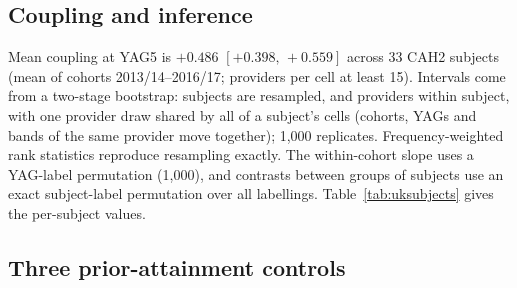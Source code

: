 \documentclass[11pt]{article}
\newcommand{\ci}[2]{$[#1,\allowbreak\,#2]$}
\begin{document}
\subsection{Coupling and inference}\label{sec:ukcoupling}

Mean coupling at YAG5 is $+0.486$ \ci{+0.398}{+0.559} across 33 CAH2 subjects (mean of cohorts 2013/14--2016/17;
providers per cell at least 15). Intervals come from a two-stage bootstrap: subjects are resampled, and providers
within subject, with one provider draw shared by all of a subject's cells (cohorts, YAGs and bands of the same
provider move together); 1,000 replicates. Frequency-weighted rank statistics reproduce resampling exactly. The
within-cohort slope uses a YAG-label permutation (1,000), and contrasts between groups of subjects use an exact
subject-label permutation over all labellings. Table~\ref{tab:uksubjects} gives the per-subject values.

\subsection{Three prior-attainment controls}\label{sec:ukcontrols}
\end{document}
